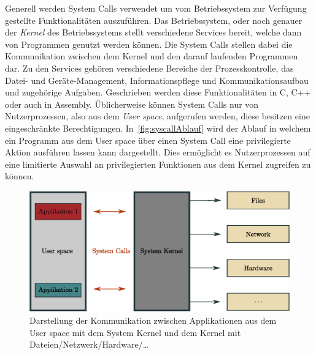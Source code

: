         Generell werden System Calls verwendet um vom Betriebssystem zur Verfügung gestellte Funktionalitäten auszuführen.
        Das Betriebssystem, oder noch genauer der \textit{Kernel}  des Betriebssystems stellt verschiedene Services bereit, welche dann von Programmen genutzt werden können. 
        Die System Calls stellen dabei die Kommunikation zwischen dem Kernel und den darauf laufenden Programmen dar.
        Zu den Services gehören verschiedene Bereiche der Prozesskontrolle, das Datei- und Geräte-Management, Informationspflege und Kommunikationsaufbau und zugehörige Aufgaben.
        Geschrieben werden diese Funktionalitäten in C, C++ oder auch in Assembly.
        Üblicherweise können System Calls nur von Nutzerprozessen, also aus dem \textit{User space}, aufgerufen werden, diese besitzen eine eingeschränkte Berechtigungen.
        In~\autoref{fig:syscallAblauf} wird der Ablauf in welchem ein Programm aus dem User space über einen System Call eine privilegierte Aktion ausführen lassen kann dargestellt.
        Dies ermöglicht es Nutzerprozessen auf eine limitierte Auswahl an privilegierten Funktionen aus dem Kernel zugreifen zu können.~\cite{SYSCALL_SILBERSCHATZ}
    
        \begin{figure}[ht]
            \centering
            \includegraphics[width=1\textwidth]{images/Illustrationen/IDS/syscalls}
            \caption[ass]{Darstellung der Kommunikation zwischen Applikationen aus dem User space mit dem System Kernel und dem Kernel mit Dateien/Netzwerk/Hardware/\dots}
            \label{fig:syscallAblauf}
        \end{figure}

